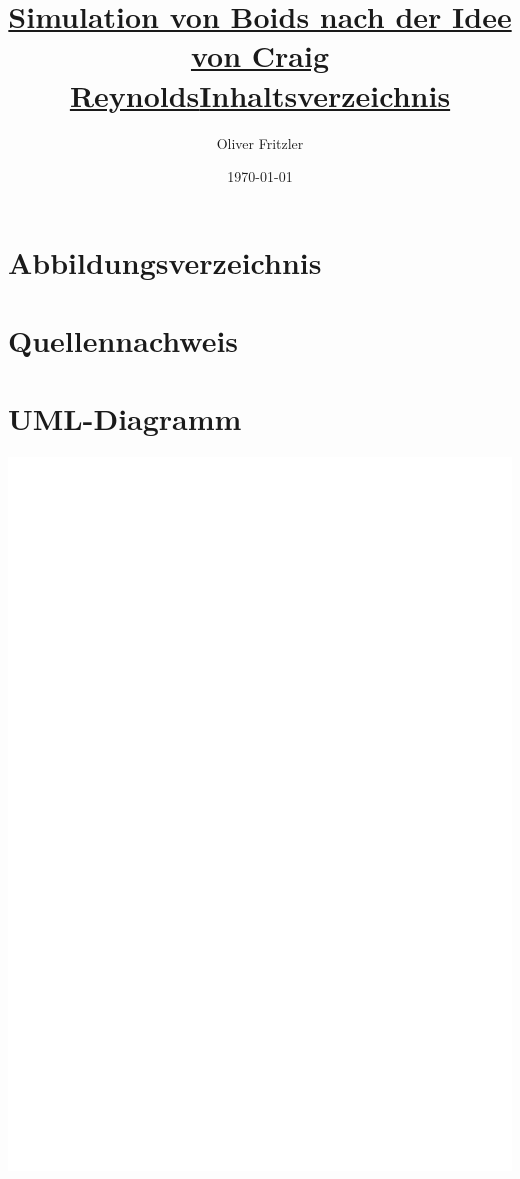 \documentclass[a4paper, 12pt]{article}
\begin{document}
	\begin{titlepage}
		\title{\Large{\textbf{\underline{Simulation von Boids nach der Idee von Craig Reynolds}}}}
		\author{Oliver Fritzler}
		\date{\today}
		\maketitle
	\end{titlepage}
	\title{\Large{\textbf{\underline{Inhaltsverzeichnis}}}}
	\tableofcontents
	\newpage
	\section{Abbildungsverzeichnis}
	\newpage
	\section{Quellennachweis}
	\newpage
	\section{UML-Diagramm}
	\includegraphics[scale=0.75, page=2]{UML/Boids_UML.pdf}
	\newpage
\end{document}
